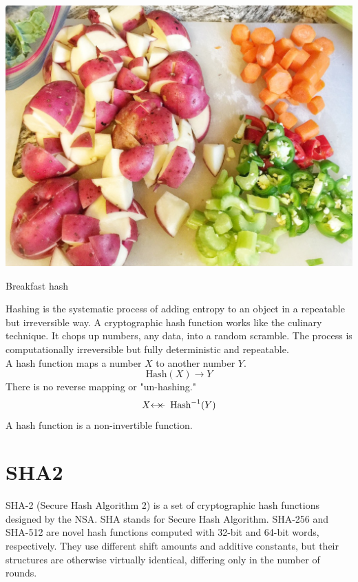 \documentclass{tufte-handout}
\begin{document}

\begin{marginfigure}[20 pt]%
  \includegraphics[width=\linewidth]{hash.jpg}
  \caption{Breakfast hash }
  \label{fig:marginfig}
\end{marginfigure}


Hashing is the systematic process of adding entropy to an object in a repeatable but irreversible way.  A cryptographic hash function works like the culinary technique.  It chops up numbers, any data, into a random scramble.  The process is computationally irreversible but fully deterministic and repeatable.  \\

A hash function maps a number $X$ to another number $Y$.
$$\text{Hash}(X)\longrightarrow Y$$
There is no reverse mapping or "un-hashing."  
$$X\mathrlap{\longleftarrow}{\ \ \Large \times}\ \  \text{Hash}^{-1}(Y)$$
A hash function is a non-invertible function.

\section{SHA2}
SHA-2 (Secure Hash Algorithm 2) is a set of cryptographic hash functions designed by the NSA. SHA stands for Secure Hash Algorithm. SHA-256 and SHA-512 are novel hash functions computed with 32-bit and 64-bit words, respectively. They use different shift amounts and additive constants, but their structures are otherwise virtually identical, differing only in the number of rounds.
\end{document}
